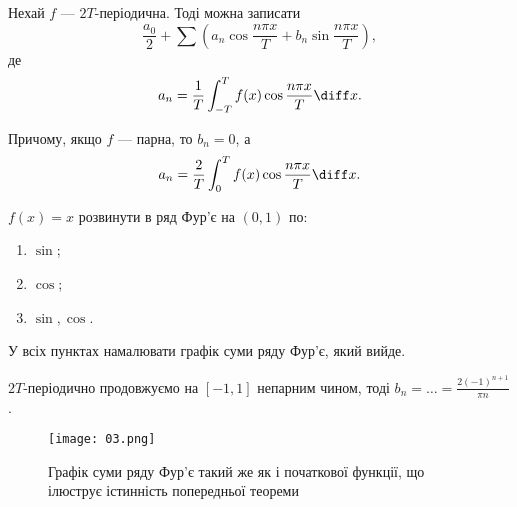 Нехай $f$ --- $2T$-періодична. Тоді можна записати
\begin{equation}
    \frac{a_0}{2} + \sum \left( a_n \cos \frac{n \pi x}{T} + b_n \sin \frac{n \pi x}{T} \right),
\end{equation}
де
\begin{equation}
    a_n = \frac{1}{T} \int_{-T}^T f(x) \cos \frac{n \pi x}{T} \diff x.
\end{equation}

Причому, якщо $f$ --- парна, то $b_n = 0$, а
\begin{equation}
    a_n = \frac{2}{T} \int_0^T f(x) \cos \frac{n \pi x}{T} \diff x.
\end{equation}

\begin{example}
    $f(x) = x$ розвинути в ряд Фур'є на $(0, 1)$ по:
    \begin{enumerate}
        \item $\sin$;
        \item $\cos$;
        \item $\sin, \cos$.
    \end{enumerate}
    
    У всіх пунктах намалювати графік суми ряду Фур'є, який вийде.
\end{example}
\begin{solution}
    $2T$-періодично продовжуємо на $[-1,1]$ непарним чином, тоді $b_n = \ldots = \frac{2 (-1)^{n + 1}}{\pi n}$.

    \begin{figure}[H]
        \centering
        \texttt{[image: 03.png]}
        \caption{Графік суми ряду Фур'є такий же як і початкової функції, що ілюструє істинність попередньої теореми}
    \end{figure}
\end{solution}
